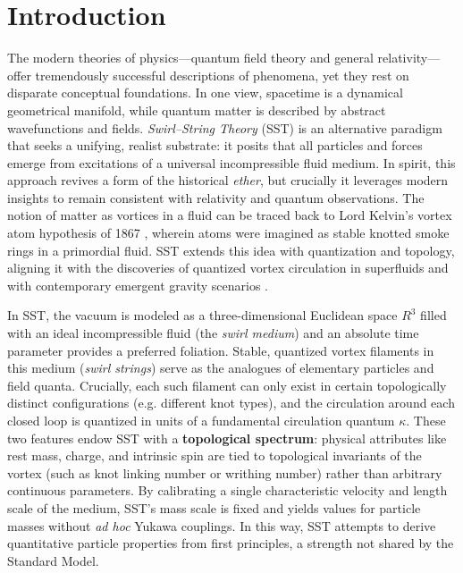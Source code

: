 \documentclass[10pt,reprint,aps,onecolumn,nofootinbib]{revtex4-2}
\begin{document}
\section{Introduction}

The modern theories of physics---quantum field theory and general relativity---offer tremendously successful descriptions of phenomena, yet they rest on disparate conceptual foundations. In one view, spacetime is a dynamical geometrical manifold, while quantum matter is described by abstract wavefunctions and fields. \emph{Swirl--String Theory} (SST) is an alternative paradigm that seeks a unifying, realist substrate: it posits that all particles and forces emerge from excitations of a universal incompressible fluid medium. In spirit, this approach revives a form of the historical \emph{ether}, but crucially it leverages modern insights to remain consistent with relativity and quantum observations. The notion of matter as vortices in a fluid can be traced back to Lord Kelvin’s vortex atom hypothesis of 1867 \cite{Kelvin1867}, wherein atoms were imagined as stable knotted smoke rings in a primordial fluid. SST extends this idea with quantization and topology, aligning it with the discoveries of quantized vortex circulation in superfluids \cite{Onsager1949, Feynman1955} and with contemporary emergent gravity scenarios \cite{Jacobson1995, Verlinde2011, Barcelo2011}.


In SST, the vacuum is modeled as a three-dimensional Euclidean space $R^3$ filled with an ideal incompressible fluid (the \emph{swirl medium}) and an absolute time parameter provides a preferred foliation. Stable, quantized vortex filaments in this medium (\emph{swirl strings}) serve as the analogues of elementary particles and field quanta. Crucially, each such filament can only exist in certain topologically distinct configurations (e.g. different knot types), and the circulation around each closed loop is quantized in units of a fundamental circulation quantum $\kappa$. These two features endow SST with a \textbf{topological spectrum}: physical attributes like rest mass, charge, and intrinsic spin are tied to topological invariants of the vortex (such as knot linking number or writhing number) rather than arbitrary continuous parameters. By calibrating a single characteristic velocity and length scale of the medium, SST’s mass scale is fixed and yields values for particle masses without \emph{ad hoc} Yukawa couplings. In this way, SST attempts to derive quantitative particle properties from first principles, a strength not shared by the Standard Model.
\end{document}

